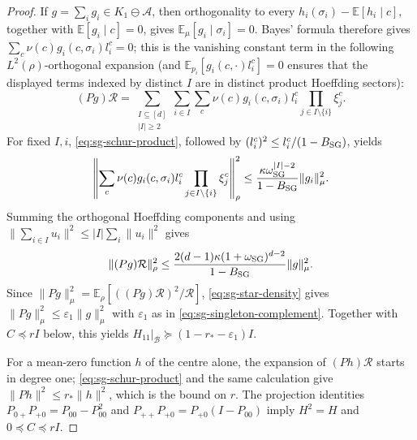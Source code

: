 \begin{proof}
If $g=\sum_i g_i\in K_1\ominus\mathcal A$, then orthogonality to every
$h_i(\sigma_i)-\mathbb E[h_i\mid c]$, together with
$\mathbb E[g_i\mid c]=0$, gives
$\mathbb E_\mu[g_i\mid\sigma_i]=0$.  Bayes' formula therefore gives
$\sum_c\nu(c)g_i(c,\sigma_i)l_i^c=0$; this is the vanishing constant
term in the following $L^2(\rho)$-orthogonal expansion (and
$\mathbb E_{p_i}[g_i(c,\cdot)l_i^c]=0$ ensures that the displayed terms
indexed by distinct $I$ are in distinct product Hoeffding sectors):
\begin{equation}\label{eq:sg-hoeffding-expansion}
 (Pg)\mathcal R=\sum_{\substack{I\subseteq[d]\\|I|\ge2}}
 \sum_{i\in I}\sum_c \nu(c)g_i(c,\sigma_i)l_i^c
 \prod_{j\in I\setminus\{i\}}\xi_j^c .
\end{equation}
For fixed $I,i$, \eqref{eq:sg-schur-product}, followed by $(l_i^c)^2\le l_i^c/(1-B_{\rm SG})$, yields
\begin{equation}\label{eq:sg-component-bound}
 \left\|\sum_c\nu(c)g_i(c,\sigma_i)l_i^c
 \prod_{j\in I\setminus\{i\}}\xi_j^c\right\|_\rho^2
 \le \frac{\kappa \omega_{\rm SG}^{|I|-2}}{1-B_{\rm SG}}\|g_i\|_\mu^2.
\end{equation}
Summing the orthogonal Hoeffding components and using
$\|\sum_{i\in I}u_i\|^2\le |I|\sum_i\|u_i\|^2$ gives
\[
 \|(Pg)\mathcal R\|_\rho^2\le \frac{2(d-1)\kappa(1+\omega_{\rm SG})^{d-2}}{1-B_{\rm SG}}\|g\|_\mu^2.
\]
Since $\|Pg\|_\mu^2=\mathbb E_\rho[((Pg)\mathcal R)^2/\mathcal R]$,
\eqref{eq:sg-star-density} gives $\|Pg\|_\mu^2\le\varepsilon_1\|g\|_\mu^2$
with $\varepsilon_1$ as in \eqref{eq:sg-singleton-complement}.
Together with $C\preceq rI$ below, this yields
$H_{11}|_{\mathcal B}\succeq(1-r_*-\varepsilon_1)I$.

For a mean-zero function $h$ of the centre alone, the expansion of
$(Ph)\mathcal R$ starts in degree one;
\eqref{eq:sg-schur-product} and the same calculation give $\|Ph\|^2\le r_*\|h\|^2$,
which is the bound on $r$.  The projection identities
$P_{0+}P_{+0}=P_{00}-P_{00}^2$ and
$P_{++}P_{+0}=P_{+0}(I-P_{00})$ imply $H^2=H$ and
$0\preceq C\preceq rI$.


\end{proof}
